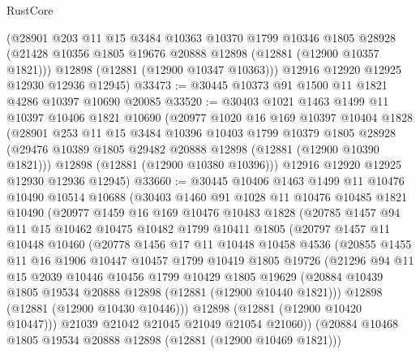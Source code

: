 \begin{lexlean}{RustCore}
\begin{coremodule}
      (@28901
        @203
        @11
        @15
        @3484
        @10363
        @10370
        @1799
        @10346
        @1805
        @28928
        (@21428 @10356 @1805 @19676 @20888 @12898 (@12881 (@12900 @10357 @1821)))
        @12898
        (@12881 (@12900 @10347 @10363)))
      @12916
      @12920
      @12925
      @12930
      @12936
      @12945)
@33473 := @30445 @10373 @91 @1500 @11 @1821 @4286 @10397 @10690 @20085
@33520 := @30403
    @1021
    @1463
    @1499
    @11
    @10397
    @10406
    @1821
    @10690
    (@20977
      @1020
      @16
      @169
      @10397
      @10404
      @1828
      (@28901
        @253
        @11
        @15
        @3484
        @10396
        @10403
        @1799
        @10379
        @1805
        @28928
        (@29476 @10389 @1805 @29482 @20888 @12898 (@12881 (@12900 @10390 @1821)))
        @12898
        (@12881 (@12900 @10380 @10396)))
      @12916
      @12920
      @12925
      @12930
      @12936
      @12945)
@33660 := @30445
    @10406
    @1463
    @1499
    @11
    @10476
    @10490
    @10514
    @10688
    (@30403
      @1460
      @91
      @1028
      @11
      @10476
      @10485
      @1821
      @10490
      (@20977
        @1459
        @16
        @169
        @10476
        @10483
        @1828
        (@20785
          @1457
          @94
          @11
          @15
          @10462
          @10475
          @10482
          @1799
          @10411
          @1805
          (@20797
            @1457
            @11
            @10448
            @10460
            (@20778
              @1456
              @17
              @11
              @10448
              @10458
              @4536
              (@20855
                @1455
                @11
                @16
                @1906
                @10447
                @10457
                @1799
                @10419
                @1805
                @19726
                (@21296
                  @94
                  @11
                  @15
                  @2039
                  @10446
                  @10456
                  @1799
                  @10429
                  @1805
                  @19629
                  (@20884 @10439 @1805 @19534 @20888 @12898 (@12881 (@12900 @10440 @1821)))
                  @12898
                  (@12881 (@12900 @10430 @10446)))
                @12898
                (@12881 (@12900 @10420 @10447)))
              @21039
              @21042
              @21045
              @21049
              @21054
              @21060))
          (@20884 @10468 @1805 @19534 @20888 @12898 (@12881 (@12900 @10469 @1821)))

\end{coremodule}
\end{lexlean}
